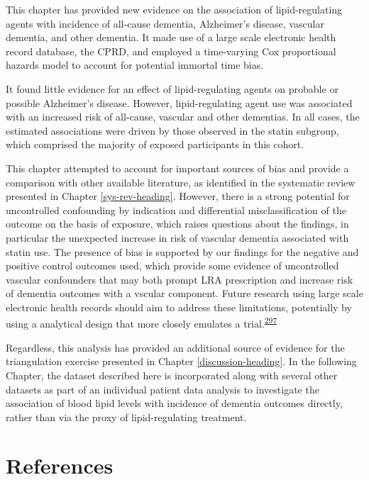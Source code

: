 \documentclass[a4paper, twoside]{templates/ociamthesis}
\begin{document}
This chapter has provided new evidence on the association of lipid-regulating agents with incidence of all-cause dementia, Alzheimer's disease, vascular dementia, and other dementia. It made use of a large scale electronic health record database, the CPRD, and employed a time-varying Cox proportional hazards model to account for potential immortal time bias.

It found little evidence for an effect of lipid-regulating agents on probable or possible Alzheimer's disease. However, lipid-regulating agent use was associated with an increased risk of all-cause, vascular and other dementias. In all cases, the estimated associations were driven by those observed in the statin subgroup, which comprised the majority of exposed participants in this cohort.

This chapter attempted to account for important sources of bias and provide a comparison with other available literature, as identified in the systematic review presented in Chapter \ref{sys-rev-heading}. However, there is a strong potential for uncontrolled confounding by indication and differential misclassification of the outcome on the basis of exposure, which raises questions about the findings, in particular the unexpected increase in risk of vascular dementia associated with statin use. The presence of bias is supported by our findings for the negative and positive control outcomes used, which provide some evidence of uncontrolled vascular confounders that may both prompt LRA prescription and increase risk of dementia outcomes with a vscular component. Future research using large scale electronic health records should aim to address these limitations, potentially by using a analytical design that more closely emulates a trial.\textsuperscript{\protect\hyperlink{ref-danaei2013b}{297}}

Regardless, this analysis has provided an additional source of evidence for the triangulation exercise presented in Chapter \ref{discussion-heading}. In the following Chapter, the dataset described here is incorporated along with several other datasets as part of an individual patient data analysis to investigate the association of blood lipid levels with incidence of dementia outcomes directly, rather than via the proxy of lipid-regulating treatment.

\newpage

\hypertarget{references-3}{%
\section{References}\label{references-3}}
\end{document}

